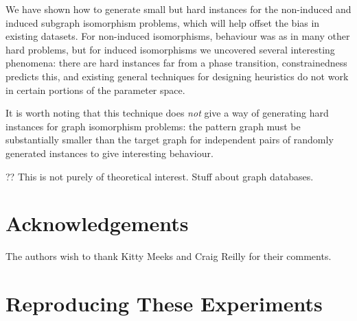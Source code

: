\documentclass[twoside,11pt]{article}
\begin{document}
We have shown how to generate small but hard instances for the non-induced and induced subgraph
isomorphism problems, which will help offset the bias in existing datasets. For non-induced
isomorphisms, behaviour was as in many other hard problems, but for induced isomorphisms we
uncovered several interesting phenomena: there are hard instances far from a phase transition,
constrainedness predicts this, and existing general techniques for designing heuristics do not work
in certain portions of the parameter space.

It is worth noting that this technique does \emph{not} give a way of generating hard instances for
graph isomorphism problems: the pattern graph must be substantially smaller than the target graph
for independent pairs of randomly generated instances to give interesting behaviour.

?? This is not purely of theoretical interest. Stuff about graph databases.

\section*{Acknowledgements}

The authors wish to thank Kitty Meeks and Craig Reilly for their comments.




\clearpage
\appendix

\section{Reproducing These Experiments}
\end{document}
